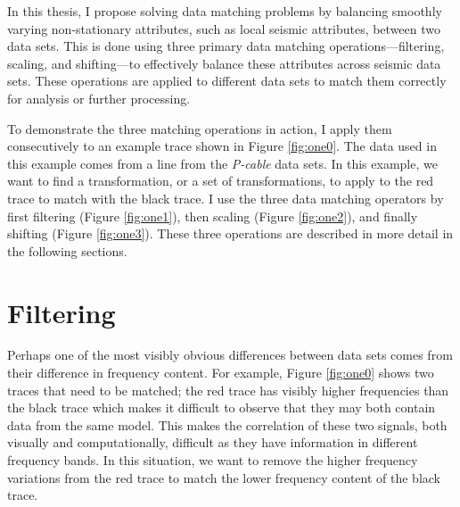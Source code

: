 
In this thesis, I propose solving data matching problems by balancing smoothly varying non-stationary attributes, such as local seismic attributes, between two data sets.
This is done using three primary data matching operations---filtering, scaling, and shifting---to effectively balance these attributes across seismic data sets.
These operations are applied to different data sets to match them correctly for analysis or further processing.

To demonstrate the three matching operations in action, I apply them consecutively to an example trace shown in Figure \ref{fig:one0}.
The data used in this example comes from a line from the {\em P-cable} data sets.
In this example, we want to find a transformation, or a set of transformations, to apply to the red trace to match with the black trace.
I use the three data matching operators by first filtering (Figure \ref{fig:one1}), then scaling (Figure \ref{fig:one2}), and finally shifting (Figure \ref{fig:one3}).
These three operations are described in more detail in the following sections.



\section{Filtering}
Perhaps one of the most visibly obvious differences between data sets comes from their difference in frequency content.
For example, Figure \ref{fig:one0} shows two traces that need to be matched; the red trace has visibly higher frequencies than the black trace which makes it difficult to observe that they may both contain data from the same model.
This makes the correlation of these two signals, both visually and computationally, difficult as they have information in different frequency bands.
In this situation, we want to remove the higher frequency variations from the red trace to match the lower frequency content of the black trace.


